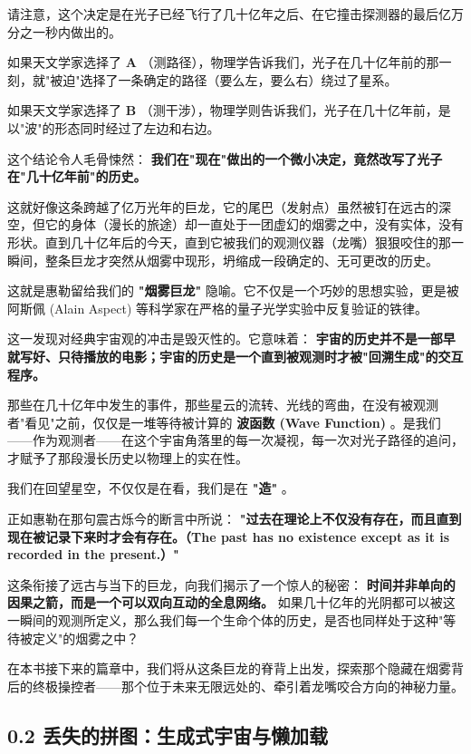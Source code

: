 请注意，这个决定是在光子已经飞行了几十亿年之后、在它撞击探测器的最后亿万分之一秒内做出的。

如果天文学家选择了 \textbf{A} （测路径），物理学告诉我们，光子在几十亿年前的那一刻，就"被迫"选择了一条确定的路径（要么左，要么右）绕过了星系。

如果天文学家选择了 \textbf{B} （测干涉），物理学则告诉我们，光子在几十亿年前，是以"波"的形态同时经过了左边和右边。

这个结论令人毛骨悚然： \textbf{我们在"现在"做出的一个微小决定，竟然改写了光子在"几十亿年前"的历史。}

这就好像这条跨越了亿万光年的巨龙，它的尾巴（发射点）虽然被钉在远古的深空，但它的身体（漫长的旅途）却一直处于一团虚幻的烟雾之中，没有实体，没有形状。直到几十亿年后的今天，直到它被我们的观测仪器（龙嘴）狠狠咬住的那一瞬间，整条巨龙才突然从烟雾中现形，坍缩成一段确定的、无可更改的历史。

这就是惠勒留给我们的 \textbf{"烟雾巨龙"} 隐喻。它不仅是一个巧妙的思想实验，更是被阿斯佩 (Alain Aspect) 等科学家在严格的量子光学实验中反复验证的铁律。

这一发现对经典宇宙观的冲击是毁灭性的。它意味着： \textbf{宇宙的历史并不是一部早就写好、只待播放的电影；宇宙的历史是一个直到被观测时才被"回溯生成"的交互程序。}

那些在几十亿年中发生的事件，那些星云的流转、光线的弯曲，在没有被观测者"看见"之前，仅仅是一堆等待被计算的 \textbf{波函数 (Wave Function)} 。是我们——作为观测者——在这个宇宙角落里的每一次凝视，每一次对光子路径的追问，才赋予了那段漫长历史以物理上的实在性。

我们在回望星空，不仅仅是在看，我们是在 \textbf{"造"} 。

正如惠勒在那句震古烁今的断言中所说： \textbf{"过去在理论上不仅没有存在，而且直到现在被记录下来时才会有存在。（The past has no existence except as it is recorded in the present.）"}

这条衔接了远古与当下的巨龙，向我们揭示了一个惊人的秘密： \textbf{时间并非单向的因果之箭，而是一个可以双向互动的全息网络。} 如果几十亿年的光阴都可以被这一瞬间的观测所定义，那么我们每一个生命个体的历史，是否也同样处于这种"等待被定义"的烟雾之中？

在本书接下来的篇章中，我们将从这条巨龙的脊背上出发，探索那个隐藏在烟雾背后的终极操控者——那个位于未来无限远处的、牵引着龙嘴咬合方向的神秘力量。

\subsection{0.2 丢失的拼图：生成式宇宙与懒加载}

